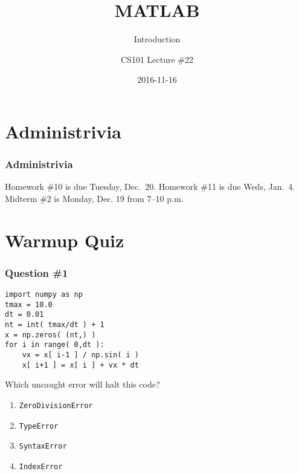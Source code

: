 \documentclass[11pt]{beamer}
\title{MATLAB}
\subtitle{Introduction}
\author{CS101 Lecture \#22}
\date{2016-11-16}
\begin{document}
  \setcounter{showProgressBar}{0}
  \setcounter{showSlideNumbers}{0}

\frame{\titlepage}

\setcounter{framenumber}{0}
\setcounter{showProgressBar}{1}
\setcounter{showSlideNumbers}{1}

\section{Administrivia}

\begin{frame}
  \frametitle{Administrivia}
  \Enlarge

   \begin{itemize}
   	\myitem  Homework \#10 is due Tuesday, Dec.\ 20.
   	\myitem Homework \#11 is due Weds, Jan.\ 4.
   	\myitem  Midterm \#2 is Monday, Dec. 19 from 7–10 p.m.
   \end{itemize}
\end{frame}

\section{Warmup Quiz}

\begin{frame}[fragile]
  \frametitle{Question \#1}
  \Enlarge

  \begin{Verbatim}
import numpy as np
tmax = 10.0
dt = 0.01
nt = int( tmax/dt ) + 1
x = np.zeros( (nt,) )
for i in range( 0,dt ):
    vx = x[ i-1 ] / np.sin( i )
    x[ i+1 ] = x[ i ] + vx * dt
  \end{Verbatim}

Which uncaught error will halt this code?

  \begin{enumerate}[label=\Alph*]
    \item  \texttt{ZeroDivisionError}
    \item  \texttt{TypeError}
    \item  \texttt{SyntaxError}
    \item  \texttt{IndexError}
  \end{enumerate}
\end{frame}
\end{document}
